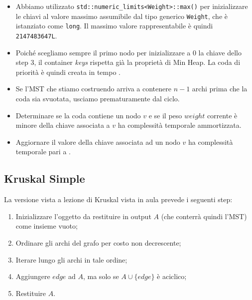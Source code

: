 \begin{itemize}
    \item Abbiamo utilizzato \texttt{std::numeric_limits<Weight>::max()} per inizializzare le chiavi al valore massimo assumibile dal tipo generico \texttt{Weight}, che è istanziato come \texttt{long}. Il massimo valore rappresentabile è quindi \texttt{2147483647L}. \\

    \item Poiché scegliamo sempre il primo nodo per inizializzare a 0 la chiave dello step 3, il container \textit{keys} rispetta già la proprietà di Min Heap. La coda di priorità è quindi creata in tempo \complexityConstant{}. \\

    \item Se l'MST che stiamo costruendo arriva a contenere $n - 1$ archi prima che la coda sia svuotata, usciamo prematuramente dal ciclo. \\

    \item Determinare se la coda contiene un nodo $v$ e se il peso $weight$ corrente è minore della chiave associata a $v$ ha complessità temporale \complexityConstant{} ammortizzata.\\

    \item Aggiornare il valore della chiave associata ad un nodo $v$ ha complessità temporale pari a \complexityLogN{}.\\
\end{itemize}


\subsection{Kruskal Simple}

La versione vista a lezione di Kruskal vista in aula prevede i seguenti step:

\begin{enumerate}
    \item Inizializzare l'oggetto da restituire in output $A$ (che conterrà quindi l'MST) come insieme vuoto;
    \item Ordinare gli archi del grafo per costo non decrescente;
    \item Iterare lungo gli archi in tale ordine;
    \item Aggiungere $edge$ ad $A$, ma solo se $A \cup \{ edge \}$ è aciclico;
    \item Restituire $A$.
\end{enumerate}

